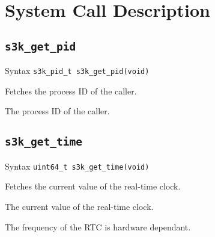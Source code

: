 \documentclass[a4paper,11pt]{article}
\newcommand{\syscall}[1]{\texttt{#1}}
\newenvironment{syscalldoc}[1]{
  \subsection{\syscall{#1}} %
  \begin{tcolorbox}
  \begin{description}[leftmargin=!,style=nextline,noitemsep]
}{
  \end{description}
  \end{tcolorbox}
}
\begin{document}

\newpage
\section{System Call Description}

\begin{syscalldoc}{s3k\_get\_pid}
  \item[Syntax] \lstinline{s3k_pid_t s3k_get_pid(void)}
  \item[Description] Fetches the process ID of the caller.
  \item[Returns] The process ID of the caller.
\end{syscalldoc}

\begin{syscalldoc}{s3k\_get\_time}
  \item[Syntax] \lstinline{uint64_t s3k_get_time(void)}
  \item[Description] Fetches the current value of the real-time clock.
  \item[Returns] The current value of the real-time clock.
  \item[Notes] The frequency of the RTC is hardware dependant.
\end{syscalldoc}
\end{document}
